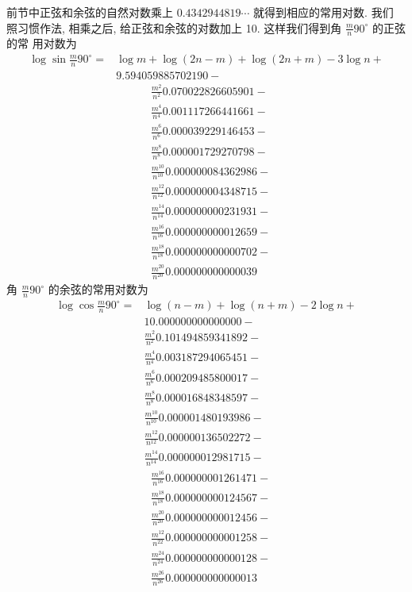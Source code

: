 前节中正弦和余弦的自然对数乘上 $0.4342944819 \cdots$ 就得到相应的常用对数. 我们 照习惯作法, 相乘之后, 给正弦和余弦的对数加上 10. 这样我们得到角 $\frac{m}{n} 90^{\circ}$ 的正弦的常 用对数为
\[
\begin{aligned}
\log \sin \frac{m}{n} 90^{\circ}= & \log m+\log (2 n-m)+\log (2 n+m)-3 \log n+ \\
& 9.594059885702190-
\end{aligned}
\]
\[
\begin{aligned}
& \frac{m^{2}}{n^{2}} 0.070022826605901- \\
& \frac{m^{4}}{n^{4}} 0.001117266441661- \\
& \frac{m^{6}}{n^{6}} 0.000039229146453- \\
& \frac{m^{8}}{n^{8}} 0.000001729270798- \\
& \frac{m^{10}}{n^{10}} 0.000000084362986- \\
& \frac{m^{12}}{n^{12}} 0.000000004348715- \\
& \frac{m^{14}}{n^{14}} 0.000000000231931- \\
& \frac{m^{16}}{n^{16}} 0.000000000012659- \\
& \frac{m^{18}}{n^{18}} 0.000000000000702- \\
& \frac{m^{20}}{n^{20}} 0.000000000000039
\end{aligned}
\]
角 $\frac{m}{n} 90^{\circ}$ 的余弦的常用对数为
\[
\begin{aligned}
\log \cos \frac{m}{n} 90^{\circ}= & \log (n-m)+\log (n+m)-2 \log n+ \\
& 10.000000000000000- \\
& \frac{m^{2}}{n^{2}} 0.101494859341892- \\
& \frac{m^{4}}{n^{4}} 0.003187294065451- \\
& \frac{m^{6}}{n^{6}} 0.000209485800017- \\
& \frac{m^{8}}{n^{8}} 0.000016848348597- \\
& \frac{m^{10}}{n^{10}} 0.000001480193986- \\
& \frac{m^{12}}{n^{12}} 0.000000136502272- \\
& \frac{m^{14}}{n^{14}} 0.000000012981715-
\end{aligned}
\]
\[
\begin{aligned}
& \frac{m^{16}}{n^{16}} 0.000000001261471- \\
& \frac{m^{18}}{n^{18}} 0.000000000124567- \\
& \frac{m^{20}}{n^{20}} 0.000000000012456- \\
& \frac{m^{12}}{n^{22}} 0.000000000001258- \\
& \frac{m^{24}}{n^{24}} 0.000000000000128- \\
& \frac{m^{26}}{n^{26}} 0.000000000000013
\end{aligned}
\]
